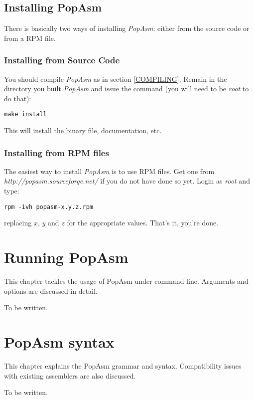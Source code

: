 \documentclass[a4paper,12pt]{book}
\begin{document}
\section{Installing PopAsm}

There is basically two ways of installing \emph{PopAsm}: either from the source code or from a
RPM file.

\subsection{Installing from Source Code}
You should compile \emph{PopAsm} as in section \ref{COMPILING}. Remain in the directory you built
\emph{PopAsm} and issue the command (you will need to be \emph{root} to do that):

\begin{verbatim}
make install
\end{verbatim}

This will install the binary file, documentation, etc.

\subsection{Installing from RPM files}
The easiest way to install \emph{PopAsm} is to use RPM files. Get one from
\emph{http://popasm.sourceforge.net/} if you do not have done so yet. Login as \emph{root} and
type:

\begin{verbatim}
rpm -ivh popasm-x.y.z.rpm
\end{verbatim}

replacing $x$, $y$ and $z$ for the appropriate values. That's it, you're done.

\chapter{Running PopAsm}

This chapter tackles the usage of PopAsm under command line. Arguments and options are
discussed in detail.

To be written.

\chapter{PopAsm syntax}

This chapter explains the PopAsm grammar and syntax. Compatibility issues with existing
assemblers are also discussed.

To be written.
\end{document}
